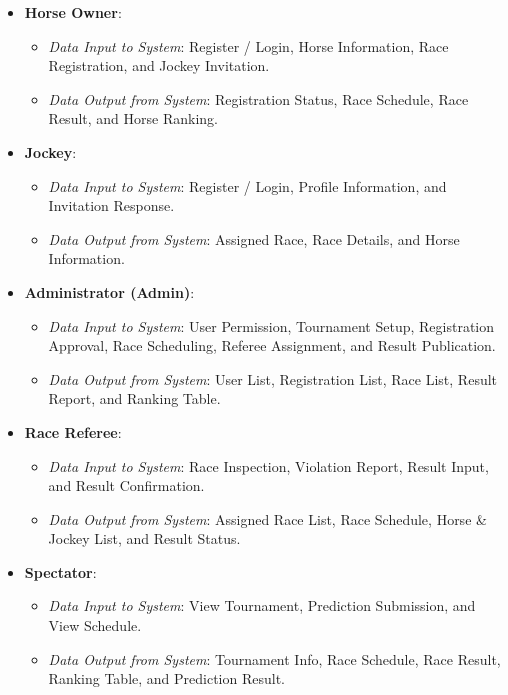\begin{itemize}
    \item \textbf{Horse Owner}:
    \begin{itemize}
        \item \textit{Data Input to System}: Register / Login, Horse Information, Race Registration, and Jockey Invitation.
        \item \textit{Data Output from System}: Registration Status, Race Schedule, Race Result, and Horse Ranking.
    \end{itemize}
    
    \item \textbf{Jockey}:
    \begin{itemize}
        \item \textit{Data Input to System}: Register / Login, Profile Information, and Invitation Response.
        \item \textit{Data Output from System}: Assigned Race, Race Details, and Horse Information.
    \end{itemize}
    
    \item \textbf{Administrator (Admin)}:
    \begin{itemize}
        \item \textit{Data Input to System}: User Permission, Tournament Setup, Registration Approval, Race Scheduling, Referee Assignment, and Result Publication.
        \item \textit{Data Output from System}: User List, Registration List, Race List, Result Report, and Ranking Table.
    \end{itemize}
    
    \item \textbf{Race Referee}:
    \begin{itemize}
        \item \textit{Data Input to System}: Race Inspection, Violation Report, Result Input, and Result Confirmation.
        \item \textit{Data Output from System}: Assigned Race List, Race Schedule, Horse \& Jockey List, and Result Status.
    \end{itemize}
    
    \item \textbf{Spectator}:
    \begin{itemize}
        \item \textit{Data Input to System}: View Tournament, Prediction Submission, and View Schedule.
        \item \textit{Data Output from System}: Tournament Info, Race Schedule, Race Result, Ranking Table, and Prediction Result.
    \end{itemize}
\end{itemize}
